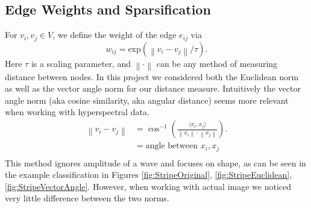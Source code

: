 \documentclass[12pt]{article}
\newcommand{\norm}[1]{\left\lVert#1\right\rVert}
\newcommand{\abs}[1]{\left\lvert#1\right\rvert}
\newcommand{\iprod}[2]{\langle#1 , #2 \rangle}
\begin{document}






\subsection{Edge Weights and Sparsification}\label{EdgeWeights}

For $v_i,v_j\in V$, we define the weight of the edge $e_{ij}$ via \[w_{ij} = \text{exp}(\norm{v_i - v_j}/\tau).\] Here $\tau$ is a scaling parameter, and $\norm{\cdot}$ can be any method of measuring distance between nodes. In this project we considered both the Euclidean norm as well as the vector angle norm for our distance measure. Intuitively the vector angle norm (aka cosine similarity, aka angular distance) seems more relevant when working with hyperspectral data.
\begin{align*}
\norm{v_i - v_j} &= \cos^{-1}\left(\frac{\iprod{x_i}{x_j}}{\norm{x_i}\cdot\norm{x_j}}\right). \\
&= \text{angle between $x_i,x_j$}\\
\end{align*}
This method ignores amplitude of a wave and focuses on shape, as can be seen in the example classification in Figures \ref{fig:StripeOriginal}, \ref{fig:StripeEuclidean}, \ref{fig:StripeVectorAngle}. However, when working with actual image we noticed very little difference between the two norms.
\end{document}
